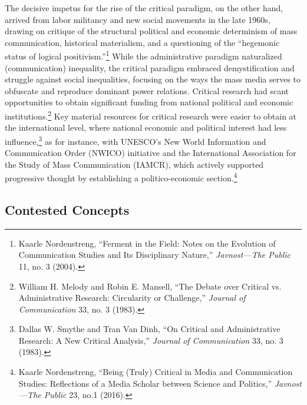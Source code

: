 \documentclass{tufte-handout}
\begin{document}
The decisive impetus for the rise of the critical paradigm, on the other
hand, arrived from labor militancy and new social movements in the late
1960s, drawing on critique of the structural political and economic
determinism of mass communication, historical materialism, and a
questioning of the ``hegemonic status of logical
positivism.''\footnote{Kaarle Nordenstreng, ``Ferment in the Field:
  Notes on the Evolution of Communication Studies and Its Disciplinary
  Nature,'' \emph{Javnost---The Public} 11, no. 3 (2004).} While the
administrative paradigm naturalized (communication) inequality, the
critical paradigm embraced demystification and struggle against social
inequalities, focusing on the ways the mass media serves to obfuscate
and reproduce dominant power relations. Critical research had scant
opportunities to obtain significant funding from national political and
economic institutions.\footnote{William H. Melody and Robin E. Mansell,
  ``The Debate over Critical vs. Administrative Research: Circularity or
  Challenge,'' \emph{Journal of Communication} 33, no. 3 (1983).} Key
material resources for critical research were easier to obtain at the
international level, where national economic and political interest had
less influence,\footnote{Dallas W. Smythe and Tran Van Dinh, ``On
  Critical and Administrative Research: A New Critical Analysis,''
  \emph{Journal of Communication} 33, no. 3 (1983).} as for instance,
with UNESCO's New World Information and Communication Order (NWICO)
initiative and the International Association for the Study of Mass
Communication (IAMCR), which actively supported progressive thought by
establishing a politico-economic section.\footnote{Kaarle Nordenstreng,
  ``Being (Truly) Critical in Media and Communication Studies:
  Reflections of a Media Scholar between Science and Politics,''
  \emph{Javnost---The Public} 23, no.1 (2016).}

\hypertarget{contested-concepts}{%
\subsection{Contested
Concepts}\label{contested-concepts}}
\end{document}
